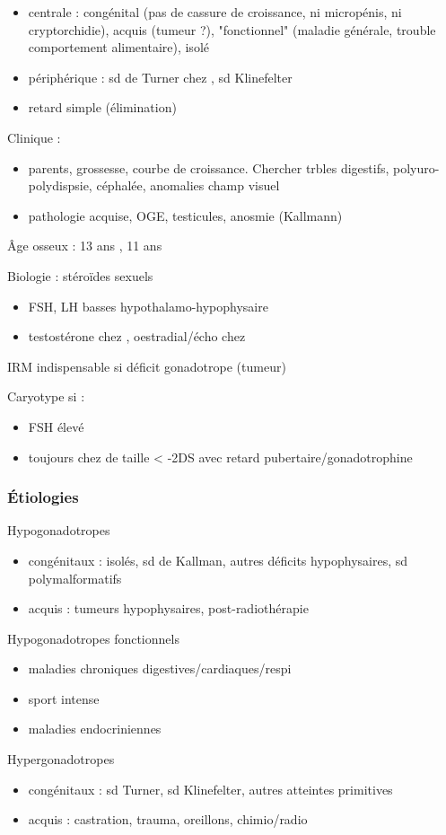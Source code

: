 \documentclass{book}
\begin{document}
\begin{itemize}
\item centrale : congénital (pas de cassure de croissance, ni micropénis, ni
cryptorchidie), acquis (tumeur ?), "fonctionnel" (maladie générale, trouble
comportement alimentaire), isolé
\item périphérique : sd de Turner chez \female, sd Klinefelter \male
\item retard simple (élimination)
\end{itemize}

Clinique : 
\begin{itemize}
\item parents, grossesse, courbe de croissance. Chercher trbles digestifs, polyuro-polydispsie, céphalée, anomalies champ visuel
\item pathologie acquise, OGE, testicules, anosmie (Kallmann)
\end{itemize}

Âge osseux : 13 ans \male, 11 ans \female

Biologie : stéroïdes sexuels
\begin{itemize}
\item FSH, LH basses \thus hypothalamo-hypophysaire
\item testostérone chez \male, oestradial/écho chez \female
\end{itemize}

IRM indispensable si déficit gonadotrope (tumeur) \danger

Caryotype si :
\begin{itemize}
\item FSH élevé
\item toujours chez \female{} de taille < -2DS avec retard pubertaire/gonadotrophine \inc
\end{itemize}

\subsubsection{Étiologies}
\label{sec:orgc179b98}
Hypogonadotropes
\begin{itemize}
\item congénitaux : isolés, sd de Kallman, autres déficits hypophysaires, sd
polymalformatifs
\item acquis : tumeurs hypophysaires, post-radiothérapie
\end{itemize}
Hypogonadotropes fonctionnels
\begin{itemize}
\item maladies chroniques digestives/cardiaques/respi
\item sport intense
\item maladies endocriniennes
\end{itemize}
Hypergonadotropes
\begin{itemize}
\item congénitaux : sd Turner, sd Klinefelter, autres atteintes primitives
\item acquis : castration, trauma, oreillons, chimio/radio
\end{itemize}
\end{document}
